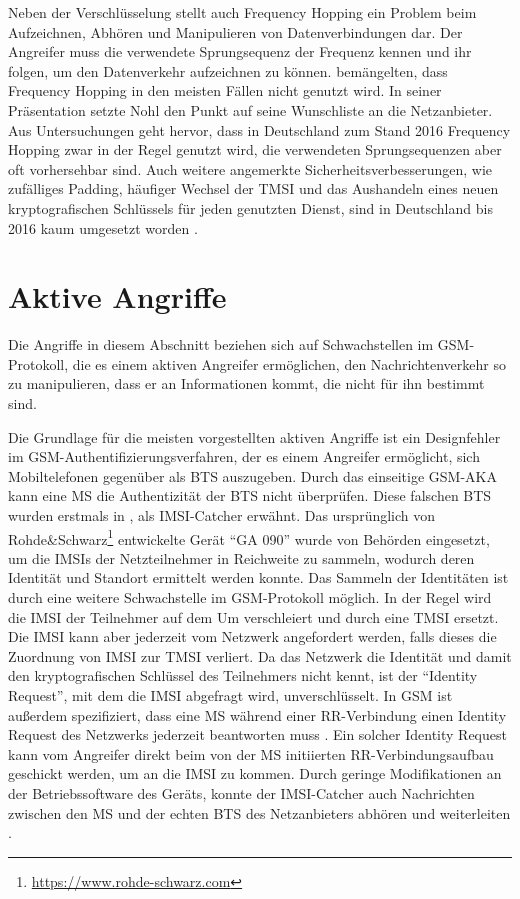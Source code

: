 Neben der Verschlüsselung stellt auch Frequency Hopping ein Problem beim Aufzeichnen, Abhören und Manipulieren von Datenverbindungen dar. Der Angreifer muss die verwendete Sprungsequenz der Frequenz kennen und ihr folgen, um den Datenverkehr aufzeichnen zu können. \citet{nohl2010wideband} bemängelten, dass Frequency Hopping in den meisten Fällen nicht genutzt wird. In seiner Präsentation setzte Nohl den Punkt auf seine Wunschliste an die Netzanbieter. Aus Untersuchungen geht hervor, dass in Deutschland zum Stand 2016 Frequency Hopping zwar in der Regel genutzt wird, die verwendeten Sprungsequenzen aber oft vorhersehbar sind. Auch weitere angemerkte Sicherheitsverbesserungen, wie zufälliges Padding, häufiger Wechsel der \ac{TMSI} und das Aushandeln eines neuen kryptografischen Schlüssels für jeden genutzten Dienst, sind in Deutschland bis 2016 kaum umgesetzt worden \citep{gsmmap:secrep-ger}.

\section{Aktive Angriffe}
Die Angriffe in diesem Abschnitt beziehen sich auf Schwachstellen im \ac{GSM}-Protokoll, die es einem aktiven Angreifer ermöglichen, den Nachrichtenverkehr so zu manipulieren, dass er an Informationen kommt, die nicht für ihn bestimmt sind.

Die Grundlage für die meisten vorgestellten aktiven Angriffe ist ein Designfehler im \ac{GSM}-Authentifizierungsverfahren, der es einem Angreifer ermöglicht, sich Mobiltelefonen gegenüber als \ac{BTS} auszugeben. Durch das einseitige \ac{GSM}-\ac{AKA} kann eine \ac{MS} die Authentizität der \ac{BTS} nicht überprüfen. Diese falschen \ac{BTS} wurden erstmals in \citet{gobel1996strafprozess}, als \ac{IMSI}-Catcher erwähnt. Das ursprünglich von Rohde{\&}Schwarz\footnote{\url{https://www.rohde-schwarz.com}} entwickelte Gerät "`GA 090"' wurde von Behörden eingesetzt, um die \acp{IMSI} der Netzteilnehmer in Reichweite zu sammeln, wodurch deren Identität und Standort ermittelt werden konnte. Das Sammeln der Identitäten ist durch eine weitere Schwachstelle im \ac{GSM}-Protokoll möglich. In der Regel wird die \ac{IMSI} der Teilnehmer auf dem \ac{Um} verschleiert und durch eine \ac{TMSI} ersetzt. Die \ac{IMSI} kann aber jederzeit vom Netzwerk angefordert werden, falls dieses die Zuordnung von \ac{IMSI} zur \ac{TMSI} verliert. Da das Netzwerk die Identität und damit den kryptografischen Schlüssel des Teilnehmers nicht kennt, ist der "`Identity Request"', mit dem die \ac{IMSI} abgefragt wird, unverschlüsselt. In \ac{GSM} ist außerdem spezifiziert, dass eine \ac{MS} während einer \ac{RR}-Verbindung einen Identity Request des Netzwerks jederzeit beantworten muss . Ein solcher Identity Request kann vom Angreifer direkt beim von der \ac{MS} initiierten \ac{RR}-Verbindungsaufbau geschickt werden, um an die \ac{IMSI} zu kommen. Durch geringe Modifikationen an der Betriebssoftware des Geräts, konnte der \ac{IMSI}-Catcher auch Nachrichten zwischen den \ac{MS} und der echten \ac{BTS} des Netzanbieters abhören und weiterleiten \citep{fox2002imsi}.

